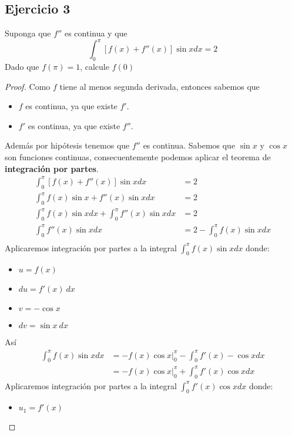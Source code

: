 \documentclass[a4paper]{article}
\begin{document}
\subsection{Ejercicio 3}
\noindent
Suponga que \(f''\) es continua y que
\[
    \int_{0}^{\pi} \left[f(x) + f''(x)\right]\sin{x} dx = 2
\]
Dado que \(f\left(\pi\right) = 1\), calcule \(f(0)\)
\begin{proof}
    Como \(f\) tiene al menos segunda derivada, entonces sabemos que
    \begin{itemize}
        \item \(f\) es continua, ya que existe \(f'\).
        \item \(f'\) es continua, ya que existe \(f''\).
    \end{itemize}
    Además por hipótesis tenemos que \(f''\) es continua. Sabemos que \(\sin{x}\) y \(\cos{x}\) son 
    funciones continuas, consecuentemente podemos aplicar el teorema de \textbf{integración por partes}.
    \begin{align*}
        \int_{0}^{\pi} \left[f(x) + f''(x)\right]\sin{x} dx &= 2 \\
        \int_{0}^{\pi} f(x)\sin{x} + f''(x)\sin{x} dx &= 2 \\
        \int_{0}^{\pi} f(x)\sin{x} dx + \int_{0}^{\pi} f''(x)\sin{x} dx &= 2 \\
        \int_{0}^{\pi} f''(x)\sin{x} dx &= 2 - \int_{0}^{\pi} f(x)\sin{x} dx \\
    \end{align*}
    Aplicaremos integración por partes a la integral \(\int_{0}^{\pi} f(x)\sin{x} dx\)
    donde:
    \begin{itemize}
        \item \(u = f(x)\)
        \item \(du = f'(x) \ dx\)
        \item \(v = -\cos{x}\)
        \item \(dv = \sin{x} \ dx\)
    \end{itemize}
    Así 
    \begin{align*}
        \int_{0}^{\pi} f(x)\sin{x} dx &= -f(x)\cos{x} \Big|_0^\pi - \int_{0}^{\pi} f'(x)-\cos{x} dx \\
                                      &= -f(x)\cos{x} \Big|_0^\pi + \int_{0}^{\pi} f'(x)\cos{x} dx
    \end{align*}
    Aplicaremos integración por partes a la integral \(\int_{0}^{\pi} f'(x)\cos{x} dx\)
    donde:
    \begin{itemize}
        \item \(u_1 = f'(x)\)

\end{itemize}
\end{proof}
\end{document}
